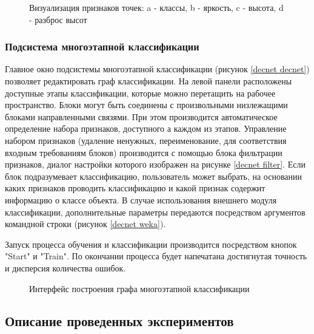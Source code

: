 \begin{figure}[h]
\centering
{}
\caption{Визуализация признаков точек: a - классы, b - яркость, c - высота, d - разброс высот}
\label{features}
\end{figure}

\subsubsection{Подсистема многоэтапной классификации}
Главное окно подсистемы многоэтапной классификации (рисунок \ref{decnet decnet}) позволяет редактировать граф классификации. На левой панели расположены доступные этапы классификации, которые можно перетащить на рабочее пространство. Блоки могут быть соединены с произвольными низлежащими блоками направленными связями. При этом производится автоматическое определение набора признаков, доступного а каждом из этапов. Управление набором признаков (удаление ненужных, переименование, для соответствия входным требованиям блоков) производится с помощью блока фильтрации признаков, диалог настройки которого изображен на рисунке \ref{decnet filter}. Если блок подразумевает классификацию, пользователь может выбрать, на основании каких признаков проводить классификацию и какой признак содержит информацию о классе объекта. В случае использования внешнего модуля классификации, дополнительные параметры передаются посредством аргументов командной строки (рисунок \ref{decnet weka}).

Запуск процесса обучения и классификации производится посредством кнопок "Start" и "Train". По окончании процесса будет напечатана достигнутая точность и дисперсия количества ошибок.

\begin{figure}[h]
\qquad
{}\qquad
{}
\caption{Интерфейс построения графа многоэтапной классификации}
\label{decnet}
\end{figure}

\subsection{Описание проведенных экспериментов}

